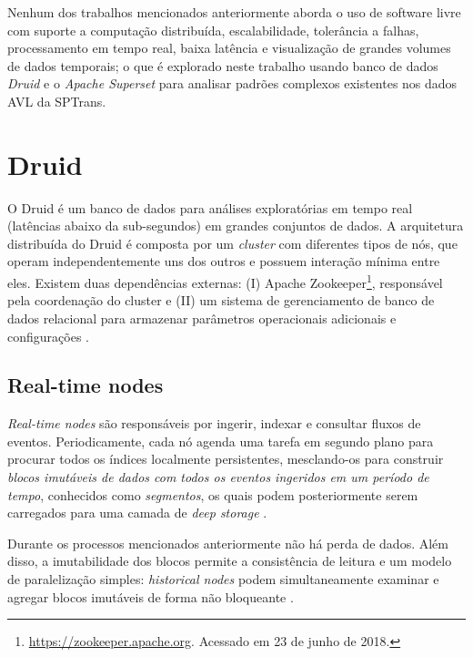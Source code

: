 \documentclass[
	12pt,				%
	oneside,			%
	a4paper,			%
	english,			%
	brazil				%
	]{abntex2ppgsi}
\begin{document}
Nenhum dos trabalhos mencionados anteriormente aborda o uso de software livre com suporte a computação distribuída, escalabilidade, tolerância a falhas, processamento em tempo real, baixa latência e visualização de grandes volumes de dados temporais; o que é explorado neste trabalho usando banco de dados \textit{Druid} e o \textit{Apache Superset} para analisar padrões complexos existentes nos dados AVL da SPTrans.

\section{Druid}
\label{druid}

O Druid é um banco de dados para análises exploratórias em tempo real (latências abaixo da sub-segundos) em grandes conjuntos de dados. A arquitetura distribuída do Druid é composta por um \textit{cluster} com diferentes tipos de nós, que operam independentemente uns dos outros e possuem interação mínima entre eles. Existem duas dependências externas: (I) Apache Zookeeper\footnote{\url{https://zookeeper.apache.org}. Acessado em 23 de junho de 2018.}, responsável pela coordenação do cluster e (II) um sistema de gerenciamento de banco de dados relacional  para armazenar parâmetros operacionais adicionais e configurações \cite{yang2014druid}.

\subsection{Real-time nodes}

\textit {Real-time nodes} são responsáveis por ingerir, indexar e consultar fluxos de eventos. Periodicamente, cada nó agenda uma tarefa em segundo plano para procurar todos os índices localmente persistentes, mesclando-os para construir \emph{blocos imutáveis de dados com todos os eventos ingeridos em um período de tempo}, conhecidos como \emph{segmentos}, os quais podem posteriormente serem carregados para uma camada de \textit {deep storage} \cite{yang2014druid}.

Durante os processos mencionados anteriormente não há perda de dados. Além disso, a imutabilidade dos blocos permite a consistência de leitura e um modelo de paralelização simples: \textit{historical nodes} podem simultaneamente examinar e agregar blocos imutáveis de forma não bloqueante \cite{yang2014druid}.
\end{document}
